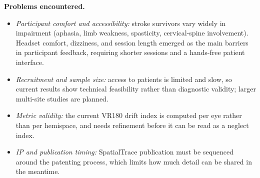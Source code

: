 \documentclass[12pt]{article}
\begin{document}
\textbf{Problems encountered.}
\begin{itemize}[leftmargin=1.5em]
    \item \textit{Participant comfort and accessibility:} stroke survivors vary widely in impairment (aphasia, limb weakness, spasticity, cervical-spine involvement). Headset comfort, dizziness, and session length emerged as the main barriers in participant feedback, requiring shorter sessions and a hands-free patient interface.
    \item \textit{Recruitment and sample size:} access to patients is limited and slow, so current results show technical feasibility rather than diagnostic validity; larger multi-site studies are planned.
    \item \textit{Metric validity:} the current VR180 drift index is computed per eye rather than per hemispace, and needs refinement before it can be read as a neglect index.
    \item \textit{IP and publication timing:} SpatialTrace publication must be sequenced around the patenting process, which limits how much detail can be shared in the meantime.
\end{itemize}
\end{document}
